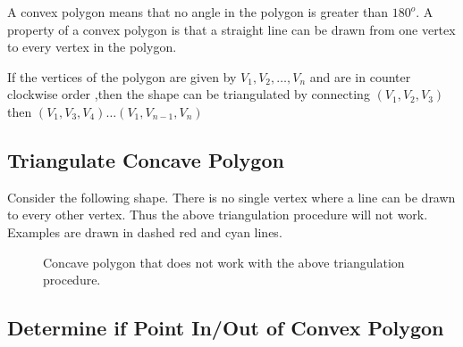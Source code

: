 \documentclass[a4paper,10pt]{scrartcl}
\begin{document}
A convex polygon means that no angle in the polygon is greater than $180 ^o$. A property of a convex polygon is that
a straight line can be drawn from one vertex to every vertex in the polygon.

If the vertices of the polygon are given by $V_1, V_2, \dots, V_n$ and are in counter clockwise order
,then the shape can be triangulated by connecting $(V_1, V_2, V_3)$ then $(V_1, V_3, V_4) \dots (V_1, V_{n-1}, V_{n})$

\subsection{Triangulate Concave Polygon}

Consider the following shape. There is no single vertex where a line can be drawn to every other vertex.
Thus the above triangulation procedure will not work. Examples are drawn in dashed red and cyan lines.

\begin{figure}[!h]
 \centering

 \caption{Concave polygon that does not work with the above triangulation procedure.}
 
\end{figure}

\newpage
\subsection{Determine if Point In/Out of Convex Polygon}
\end{document}
